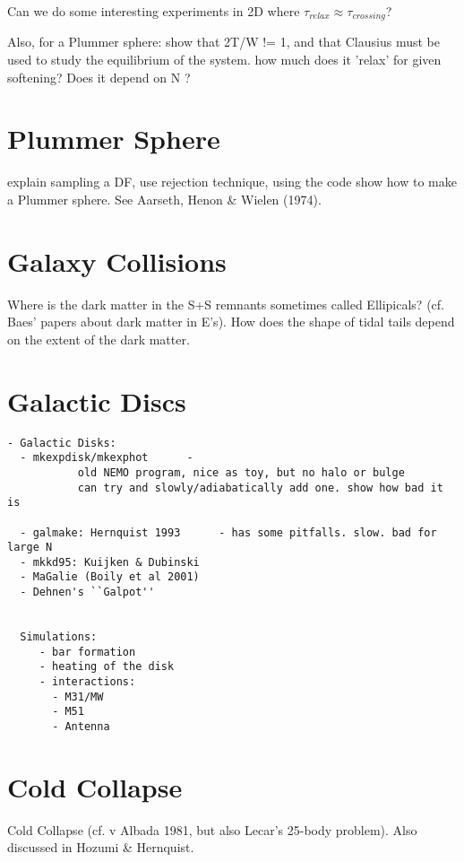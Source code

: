 Can we do some interesting experiments in 2D where $\tau_{relax} \approx \tau_{crossing}$?


Also, for a Plummer sphere: show that 2T/W != 1, and that Clausius must be used to study
the equilibrium of the system. how much does it 'relax' for given softening?
Does it depend on N ?


\section{Plummer Sphere}

explain sampling a DF, use rejection technique, 
using the code show how to make a Plummer sphere. See
Aarseth, Henon \& Wielen (1974).

\section{Galaxy Collisions}


Where is the dark matter in the S+S remnants sometimes called Ellipicals?
(cf. Baes' papers about dark matter in E's). How does the shape
of tidal tails depend on the extent of the dark matter.


\section{Galactic Discs}

\footnotesize\begin{verbatim}
- Galactic Disks:
  - mkexpdisk/mkexphot      - 
           old NEMO program, nice as toy, but no halo or bulge
           can try and slowly/adiabatically add one. show how bad it is

  - galmake: Hernquist 1993      - has some pitfalls. slow. bad for large N
  - mkkd95: Kuijken & Dubinski
  - MaGalie (Boily et al 2001) 
  - Dehnen's ``Galpot''


  Simulations:
     - bar formation
     - heating of the disk
     - interactions:
       - M31/MW
       - M51
       - Antenna
\end{verbatim}\normalsize



\section{Cold Collapse}


Cold Collapse (cf. v Albada 1981, but also Lecar's 25-body problem).
Also discussed in Hozumi \& Hernquist.


